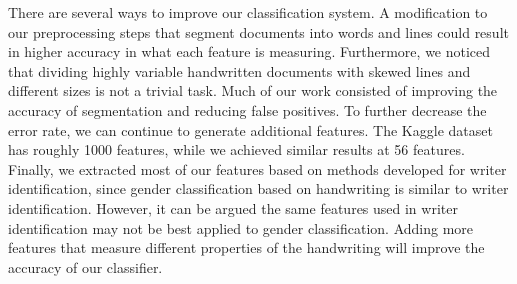 \documentclass[paper=a4, fontsize=11pt]{scrartcl} %
\numberwithin{equation}{section} %
\numberwithin{figure}{section} %
\numberwithin{table}{section} %
\begin{document}
There are several ways to improve our classification system. A
modification to our preprocessing steps that segment documents into
words and lines could result in higher accuracy in what each feature
is measuring. Furthermore, we noticed that dividing highly variable
handwritten documents with skewed lines and different sizes is not a
trivial task. Much of our work consisted of improving the accuracy of
segmentation and reducing false positives. To further decrease the
error rate, we can continue to generate additional features. The
Kaggle dataset has roughly 1000 features, while we achieved similar
results at 56 features. Finally, we extracted most of our features
based on methods developed for writer identification, since gender
classification based on handwriting is similar to writer
identification. However, it can be argued the same features used in
writer identification may not be best applied to gender
classification. Adding more features that measure different properties
of the handwriting will improve the accuracy of our classifier.



\end{document}
